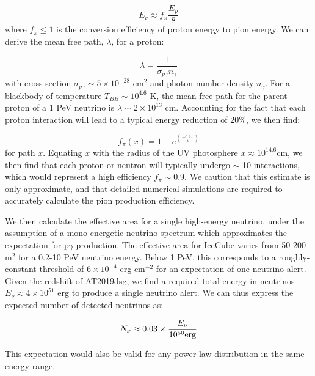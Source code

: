 \documentclass{nature_plusfigure}
\begin{document}
\begin{methods}
\begin{equation}
E_{\nu} \approx f_{\pi} \frac{E_{p}}{8}
\end{equation} where $f_{\pi} \leq1$ is the conversion efficiency of proton energy to pion energy. We can derive the mean free path, $\lambda$, for a proton:

\begin{equation}
\lambda = \frac{1}{\sigma_{p\gamma} n_{\gamma}}
\end{equation} with cross section $\sigma_{p\gamma} \sim 5 \times 10^{-28}$ cm$^{2}$ and photon number density $n_{\gamma}$. For a blackbody of temperature $T_{BB} \sim 10^{4.6}$ K, the mean free path for the parent proton of a 1 PeV neutrino is $\lambda \sim 2 \times 10^{13}$ cm. Accounting for the fact that each proton interaction will lead to a typical energy reduction of 20\%, we then find:

\begin{equation}
f_{\pi}(x) = 1 - e^{\left( \frac{-0.2x}{\lambda} \right)}
\end{equation} for path $x$. Equating $x$ with the radius of the UV photosphere $x \approx 10^{14.6}$cm, we then find that each proton or neutron will typically undergo $\sim$ 10 interactions, which would represent a high efficiency $f_{\pi} \sim 0.9$. We caution that this estimate is only approximate, and that detailed numerical simulations are required to accurately calculate the pion production efficiency\cite{2010ApJ...721..630H}.

We then calculate the effective area for a single high-energy neutrino, under the assumption of a mono-energetic neutrino spectrum which approximates the expectation for p$\gamma$ production. The effective area for IceCube varies from 50-200 m$^{2}$ for a 0.2-10 PeV neutrino energy. Below 1 PeV, this corresponds to a roughly-constant threshold of $6 \times 10^{-4}$ erg cm$^{-2}$ for an expectation of one neutrino alert. Given the redshift of AT2019dsg, we find a required total energy in neutrinos $E_{\nu} \approx 4 \times 10^{51}$ erg to produce a single neutrino alert. 
We can thus express the expected number of detected neutrinos as:

\begin{equation}
N_\nu \approx  0.03 \times \frac{E_{\nu}}{10^{50} \rm erg}
\end{equation} 

This expectation would also be valid for any power-law distribution in the same energy range.


\end{methods}
\end{document}
